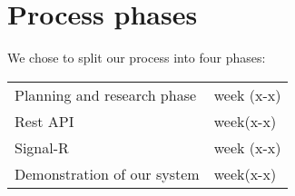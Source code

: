 \section{Process phases}

We chose to split our process into four phases:

\begin{tabular}{l l}
Planning and research phase & week (x-x) \\
Rest API & week(x-x) \\
Signal-R & week (x-x) \\
Demonstration of our system & week(x-x) 
\end{tabular}